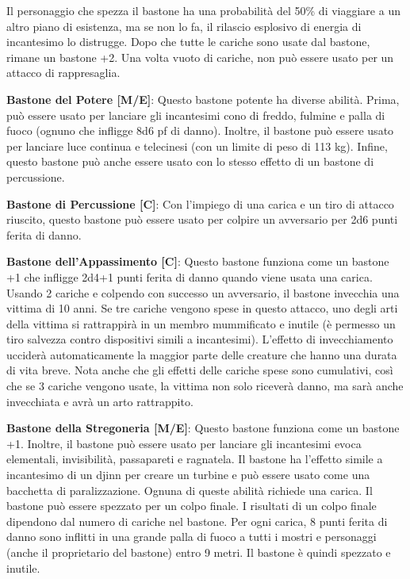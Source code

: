 \documentclass{article}
\begin{document}
\begin{multicols}{2}
Il personaggio che spezza il bastone ha una probabilità del 50\% di viaggiare a un altro piano di esistenza, ma se non lo fa, il rilascio esplosivo di energia di incantesimo lo distrugge. Dopo che tutte le cariche sono usate dal bastone, rimane un bastone +2. Una volta vuoto di cariche, non può essere usato per un attacco di rappresaglia.

\textbf{Bastone del Potere [M/E]}: Questo bastone potente ha diverse abilità. Prima, può essere usato per lanciare gli incantesimi cono di freddo, fulmine e palla di fuoco (ognuno che infligge 8d6 pf di danno). Inoltre, il bastone può essere usato per lanciare luce continua e telecinesi (con un limite di peso di 113 kg). Infine, questo bastone può anche essere usato con lo stesso effetto di un bastone di percussione.

\textbf{Bastone di Percussione [C]}: Con l'impiego di una carica e un tiro di attacco riuscito, questo bastone può essere usato per colpire un avversario per 2d6 punti ferita di danno.

\textbf{Bastone dell'Appassimento [C]}: Questo bastone funziona come un bastone +1 che infligge 2d4+1 punti ferita di danno quando viene usata una carica. Usando 2 cariche e colpendo con successo un avversario, il bastone invecchia una vittima di 10 anni. Se tre cariche vengono spese in questo attacco, uno degli arti della vittima si rattrappirà in un membro mummificato e inutile (è permesso un tiro salvezza contro dispositivi simili a incantesimi). L'effetto di invecchiamento ucciderà automaticamente la maggior parte delle creature che hanno una durata di vita breve. Nota anche che gli effetti delle cariche spese sono cumulativi, così che se 3 cariche vengono usate, la vittima non solo riceverà danno, ma sarà anche invecchiata e avrà un arto rattrappito.

\textbf{Bastone della Stregoneria [M/E]}: Questo bastone funziona come un bastone +1. Inoltre, il bastone può essere usato per lanciare gli incantesimi evoca elementali, invisibilità, passapareti e ragnatela. Il bastone ha l'effetto simile a incantesimo di un djinn per creare un turbine e può essere usato come una bacchetta di paralizzazione. Ognuna di queste abilità richiede una carica. Il bastone può essere spezzato per un colpo finale. I risultati di un colpo finale dipendono dal numero di cariche nel bastone. Per ogni carica, 8 punti ferita di danno sono inflitti in una grande palla di fuoco a tutti i mostri e personaggi (anche il proprietario del bastone) entro 9 metri. Il bastone è quindi spezzato e inutile.


\end{multicols}
\end{document}
